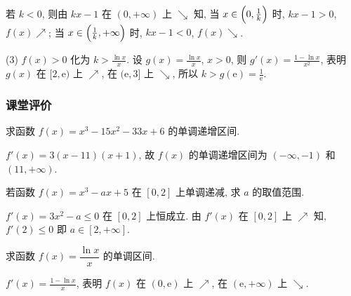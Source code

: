     若 $k<0$, 则由 $kx-1$ 在 $(0,+\infty)$ 上 $\searrow$ 知, 当 $x\in\Bigl(0,\frac1k\Bigr)$ 时, $kx-1>0$, $f(x)\nearrow$; 当 $x\in\Bigl(\frac1k,+\infty\Bigr)$ 时, $kx-1<0$, $f(x)\searrow$.
    
    (3) $f(x)>0$ 化为 $k>\frac{\ln x}x$. 
    设 $g(x)= \frac{\ln x}x$, $x>0$, 则 $g'(x)=\frac{1-\ln x}{x^2}$, 表明 $g(x)$ 在 $[2,\mathrm{e})$ 上 $\nearrow$, 在 $(\mathrm{e},3]$ 上 $\searrow$, 所以 $k>g(\mathrm{e})=\frac1{\mathrm{e}}$.
  \endsolution
  
  \subsubsection{课堂评价}
  \begin{exercise}
    求函数 $f(x)=x^3 -15x^2 -33x+6$ 的单调递增区间.
  \end{exercise}

  \beginsolution
    $f'(x)=3(x-11)(x+1)$, 
    故 $f(x)$ 的单调递增区间为 $(-\infty,-1)$ 和 $(11,+\infty)$.
  \endsolution
  
  \begin{exercise}
    若函数 $f(x)=x^3 -ax+5$ 在 $[0,2]$ 上单调递减, 求 $a$ 的取值范围.
  \end{exercise}

  \beginsolution
    $f'(x)=3x^2-a\leqslant 0$ 在 $[0,2]$ 上恒成立. 由 $f'(x)$ 在 $[0,2]$ 上 $\nearrow$ 知, $f'(2)\leqslant 0$ 即 $a\in[2,+\infty]$.
  \endsolution
  
  \begin{exercise}
    求函数 $f(x)= \dfrac{\ln x}x$ 的单调区间.
  \end{exercise}

  \beginsolution
    $f'(x)=\frac{1-\ln x}x$, 表明 $f(x)$ 在 $(0,\mathrm{e})$ 上 $\nearrow$, 
    在 $(\mathrm{e},+\infty)$ 上 $\searrow$.
  \endsolution
  
